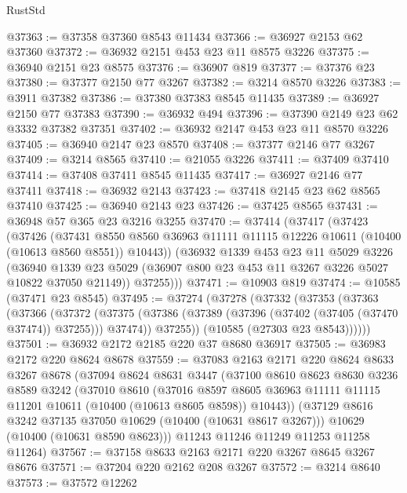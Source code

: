 \begin{lexlean}{RustStd}
\begin{coremodule}
{\begin{coremodule}
{{{{{{{{{{{{{{{{{{{{{{{{{@37363 := @37358 @37360 @8543 @11434
@37366 := @36927 @2153 @62 @37360
@37372 := @36932 @2151 @453 @23 @11 @8575 @3226
@37375 := @36940 @2151 @23 @8575
@37376 := @36907 @819
@37377 := @37376 @23
@37380 := @37377 @2150 @77 @3267
@37382 := @3214 @8570 @3226
@37383 := @3911 @37382
@37386 := @37380 @37383 @8545 @11435
@37389 := @36927 @2150 @77 @37383
@37390 := @36932 @494
@37396 := @37390 @2149 @23 @62 @3332 @37382 @37351
@37402 := @36932 @2147 @453 @23 @11 @8570 @3226
@37405 := @36940 @2147 @23 @8570
@37408 := @37377 @2146 @77 @3267
@37409 := @3214 @8565
@37410 := @21055 @3226
@37411 := @37409 @37410
@37414 := @37408 @37411 @8545 @11435
@37417 := @36927 @2146 @77 @37411
@37418 := @36932 @2143
@37423 := @37418 @2145 @23 @62 @8565 @37410
@37425 := @36940 @2143 @23
@37426 := @37425 @8565
@37431 := @36948 @57 @365 @23 @3216 @3255
@37470 := @37414
    (@37417
      (@37423
        (@37426
          (@37431
            @8550
            @8560
            @36963
            @11111
            @11115
            @12226
            @10611
            (@10400 (@10613 @8560 @8551))
            @10443))
        (@36932
          @1339
          @453
          @23
          @11
          @5029
          @3226
          (@36940 @1339 @23 @5029 (@36907 @800 @23 @453 @11 @3267 @3226 @5027 @10822 @37050 @21149))
          @37255)))
@37471 := @10903 @819
@37474 := @10585 (@37471 @23 @8545)
@37495 := @37274
    (@37278
      (@37332
        (@37353
          (@37363
            (@37366
              (@37372
                (@37375 (@37386 (@37389 (@37396 (@37402 (@37405 (@37470 @37474)) @37255))) @37474))
                @37255))
            (@10585 (@27303 @23 @8543))))))
@37501 := @36932 @2172 @2185 @220 @37 @8680 @36917
@37505 := @36983 @2172 @220 @8624 @8678
@37559 := @37083
    @2163
    @2171
    @220
    @8624
    @8633
    @3267
    @8678
    (@37094
      @8624
      @8631
      @3447
      (@37100
        @8610
        @8623
        @8630
        @3236
        @8589
        @3242
        (@37010
          @8610
          (@37016
            @8597
            @8605
            @36963
            @11111
            @11115
            @11201
            @10611
            (@10400 (@10613 @8605 @8598))
            @10443))
        (@37129 @8616 @3242 @37135 @37050 @10629 (@10400 (@10631 @8617 @3267)))
        @10629
        (@10400 (@10631 @8590 @8623)))
      @11243
      @11246
      @11249
      @11253
      @11258
      @11264)
@37567 := @37158 @8633 @2163 @2171 @220 @3267 @8645 @3267 @8676
@37571 := @37204 @220 @2162 @208 @3267
@37572 := @3214 @8640
@37573 := @37572 @12262
}}}}}}}}}}}}}}}}}}}}}}}}}
\end{coremodule}}
\end{coremodule}
\end{lexlean}
